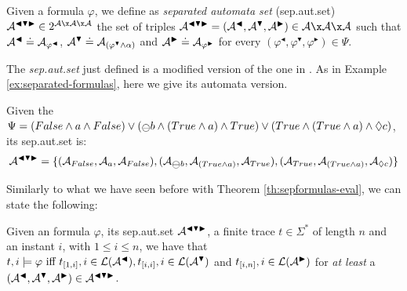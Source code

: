 \begin{definition}\label{def:automaton-eval}
Given a \LTLp formula $\varphi$, we define as \emph{separated automata set} (sep.aut.set) $\automaton^{\blacktriangleleft \blacktriangledown \blacktriangleright} \in 2^{\automaton \x \automaton \x \automaton}$ the set of triples $\automaton^{\blacktriangleleft \blacktriangledown \blacktriangleright} = (\automaton^{\blacktriangleleft}, \automaton^{\blacktriangledown}, \automaton^{\blacktriangleright}) \in \automaton \x \automaton \x \automaton$ such that $\mathcal{A}^{\blacktriangleleft} \doteq \mathcal{A}_{\varphi^\blacktriangleleft}$, $\mathcal{A}^{\blacktriangledown} \doteq \mathcal{A}_{(\varphi^\blacktriangledown \wedge \alpha)}$ and $\mathcal{A}^{\blacktriangleright} \doteq \mathcal{A}_{\varphi^\blacktriangleright}$ for every $(\varphi^{\blacktriangleleft},\varphi^{\blacktriangledown},\varphi^{\blacktriangleright}) \in \Psi$.
\end{definition}
The \textit{sep.aut.set} just defined is a modified version of the one in \citep{cecconi2018interestingness}. As in Example \ref{ex:separated-formulas}, here we give its automata version.
\begin{example}\label{ex:automata-sep-formulas}
Given the \rcon\xspace $\Psi = (False \lAND a \lAND False) \lOR (\Yesterday b \lAND (True \lAND a) \lAND True) \lOR (True \lAND (True \lAND a) \lAND \Diamond c)$, its sep.aut.set is:
\begin{align*}
\automaton^{\blacktriangleleft \blacktriangledown \blacktriangleright} = \{(\automaton_{False}, \automaton_{a}, \automaton_{False}), (\automaton_{\Yesterday b}, \automaton_{(True \lAND a)}, \automaton_{True}), (\automaton_{True}, \automaton_{(True \lAND a)}, \automaton_{\Diamond c})\}
\end{align*}
\end{example}
Similarly to what we have seen before with Theorem \ref{th:sepformulas-eval}, we can state the following:

\begin{theorem}\citep{cecconi2018interestingness}\label{th:sepautset-eval}
Given an \LTLp formula $\varphi$, its sep.aut.set $\mathcal{A}^{\blacktriangleleft \blacktriangledown \blacktriangleright}$, a finite trace $t \in \Sigma^*$ of length $n$ and an instant $i$, with $1 \le i \le n$, we have that $t,i \models \varphi \ \text{iff}\  t_{[1,i]}, i \in \mathcal{L}(\mathcal{A}^\blacktriangleleft), t_{[i,i]}, i \in \mathcal{L}(\mathcal{A}^\blacktriangledown)$ and $t_{[i,n]}, i \in \mathcal{L}(\mathcal{A}^\blacktriangleright)$ for \emph{at least} a $(\mathcal{A}^{\blacktriangleleft}, \mathcal{A}^{\blacktriangledown}, \mathcal{A}^{\blacktriangleright}) \in \mathcal{A}^{\blacktriangleleft \blacktriangledown \blacktriangleright}$.
\end{theorem}

